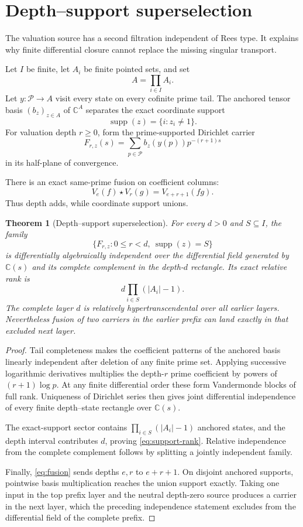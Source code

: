 \documentclass[11pt]{article}
\newtheorem{theorem}{Theorem}[section]
\theoremstyle{definition}
\theoremstyle{remark}
\newcommand{\C}{\mathbb C}
\newcommand{\cP}{\mathcal P}
\newcommand{\supp}{\operatorname{supp}}
\begin{document}
\section{Depth--support superselection}\label{sec:superselection}

The valuation source has a second filtration independent of Rees type.  It explains why finite
differential closure cannot replace the missing singular transport.

Let \(I\) be finite, let \(A_i\) be finite pointed sets, and set
\[
 A=\prod_{i\in I}A_i.
\]
Let \(y:\cP\to A\) visit every state on every cofinite prime tail.  The anchored tensor basis
\((b_z)_{z\in A}\) of \(\C^A\) separates the exact coordinate support
\[
 \supp(z)=\{i:z_i\neq1\}.
\]
For valuation depth \(r\geq0\), form the prime-supported Dirichlet carrier
\[
 F_{r,z}(s)=\sum_{p\in\cP}b_z(y(p))p^{-(r+1)s}
\tag{7.1}\label{eq:carrier}
\]
in its half-plane of convergence.

There is an exact same-prime fusion on coefficient columns:
\[
 V_e(f)\star V_r(g)=V_{e+r+1}(fg).
\tag{7.2}\label{eq:fusion}
\]
Thus depth adds, while coordinate support unions.

\begin{theorem}[Depth--support superselection]\label{thm:superselection}
For every \(d>0\) and \(S\subseteq I\), the family
\[
 \{F_{r,z}:0\leq r<d,\ \supp(z)=S\}
\tag{7.3}\label{eq:support-sector}
\]
is differentially algebraically independent over the differential field generated by
\(\C(s)\) and its complete complement in the depth-\(d\) rectangle.  Its exact relative rank is
\[
 d\prod_{i\in S}(|A_i|-1).
\tag{7.4}\label{eq:support-rank}
\]
The complete layer \(d\) is relatively hypertranscendental over all earlier layers.  Nevertheless
fusion of two carriers in the earlier prefix can land exactly in that excluded next layer.
\end{theorem}

\begin{proof}
Tail completeness makes the coefficient patterns of the anchored basis linearly independent
after deletion of any finite prime set.  Applying successive logarithmic derivatives multiplies
the depth-\(r\) prime coefficient by powers of \((r+1)\log p\).  At any finite differential
order these form Vandermonde blocks of full rank.  Uniqueness of Dirichlet series then gives joint
differential independence of every finite depth--state rectangle over \(\C(s)\).

The exact-support sector contains
\(\prod_{i\in S}(|A_i|-1)\) anchored states, and the depth interval contributes \(d\), proving
\eqref{eq:support-rank}.  Relative independence from the complete complement follows by splitting
a jointly independent family.

Finally, \eqref{eq:fusion} sends depths \(e,r\) to \(e+r+1\).  On disjoint anchored supports,
pointwise basis multiplication reaches the union support exactly.  Taking one input in the top
prefix layer and the neutral depth-zero source produces a carrier in the next layer, which the
preceding independence statement excludes from the differential field of the complete prefix.
\end{proof}
\end{document}
